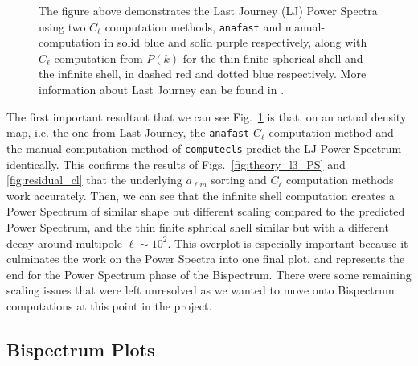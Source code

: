 \documentclass[11pt]{article}
\renewcommand{\_}[1]{\underline{ #1 }}
\newcommand{\us}{\textunderscore}
\begin{document}
{\begin{figure}[H]
    \centering
    \caption{The figure above demonstrates the Last Journey (LJ) Power Spectra using two $C_{\ell}$ computation methods, \texttt{anafast} and manual-computation in solid blue and solid purple respectively, along with $C_{\ell}$ computation from $P(k)$ for the thin finite spherical shell and the infinite shell, in dashed red and dotted blue respectively. More information about Last Journey can be found in \cite{Heitmann_2021}.}\label{fig:lj_PS}
\end{figure}

The first important resultant that we can see Fig.~\ref{fig:lj_PS} is that, on an actual density map, i.e. the one from Last Journey, the \texttt{anafast} $C_{\ell}$ computation method and the manual computation method of \texttt{compute\us cls} predict the LJ Power Spectrum identically. This confirms the results of Figs.~\ref{fig:theory_l3_PS} and \ref{fig:residual_cl} that the underlying $a_{\ell m}$ sorting and $C_{\ell}$ computation methods work accurately. Then, we can see that the infinite shell computation creates a Power Spectrum of similar shape but different scaling compared to the predicted Power Spectrum, and the thin finite sphrical shell similar but with a different decay around multipole $\ell \sim 10^2$. This overplot is especially important because it culminates the work on the Power Spectra into one final plot, and represents the end for the Power Spectrum phase of the Bispectrum. There were some remaining scaling issues that were left unresolved as we wanted to move onto Bispectrum computations at this point in the project.

\subsection{Bispectrum Plots}\label{bsplots}

}
\end{document}

